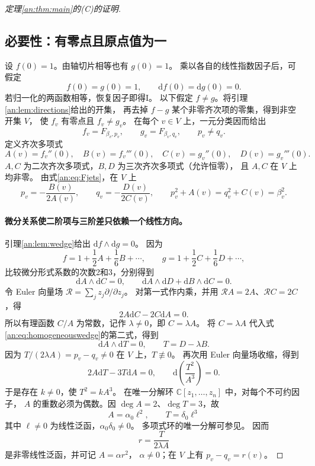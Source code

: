 \documentclass[11pt,a4paper,oneside,openany]{book}
\theoremstyle{lecture}
\newcommand{\C}{\mathbb C}
\newcommand{\dd}{\mathrm d}
\numberwithin{equation}{section}
\begin{document}
\begin{proof}[定理\ref{an:thm:main}的(C)的证明]
\subsection{必要性：有零点且原点值为一}
设 $f(0)=1$。由轴切片相等也有 $g(0)=1$。
乘以各自的线性指数因子后，可假定
\begin{equation}\label{an:eq:normalized}
 f(0)=g(0)=1,\qquad\dd f(0)=\dd g(0)=0.
\end{equation}
若归一化的两函数相等，恢复因子即得I。
以下假定 $f\ne g$。将引理\ref{an:lem:directions}给出的开集，
再去掉 $f-g$ 某个非零齐次项的零集，得到非空开集 $V$，
使 $f_v$ 有零点且 $f_v\ne g_v$。
在每个 $v\in V$ 上，一元分类因而给出
\[
 f_v=F_{\beta_v,p_v},\qquad
 g_v=F_{\beta_v,q_v},\qquad p_v\ne q_v.
\]
定义齐次多项式
\[
 A(v)=f_v''(0),\quad B(v)=f_v'''(0),\quad
 C(v)=g_v''(0),\quad D(v)=g_v'''(0).
\]
$A,C$ 为二次齐次多项式，$B,D$ 为三次齐次多项式（允许恒零），
且 $A,C$ 在 $V$ 上均非零。
由式\eqref{an:eq:Fjets}，在 $V$ 上
\begin{equation}\label{an:eq:pqjets}
 p_v=-\frac{B(v)}{2A(v)},\qquad
 q_v=-\frac{D(v)}{2C(v)},\qquad
 p_v^2+A(v)=q_v^2+C(v)=\beta_v^2.
\end{equation}

\paragraph{微分关系使二阶项与三阶差只依赖一个线性方向。}
引理\ref{an:lem:wedge}给出 $\dd f\wedge\dd g=0$。
因为
\[
 f=1+\frac12 A+\frac16 B+\cdots,\qquad
 g=1+\frac12 C+\frac16 D+\cdots,
\]
比较微分形式系数的次数2和3，分别得到
\begin{equation}\label{an:eq:homogeneouswedge}
 \dd A\wedge\dd C=0,\qquad
 \dd A\wedge\dd D+\dd B\wedge\dd C=0.
\end{equation}
令 Euler 向量场 $\mathcal R=\sum_j z_j\partial/\partial z_j$。
对第一式作内乘，并用 $\mathcal R A=2A$、$\mathcal R C=2C$，得
\[
 2A\dd C-2C\dd A=0.
\]
所以有理函数 $C/A$ 为常数，记作 $\lambda\ne0$，即 $C=\lambda A$。
将 $C=\lambda A$ 代入式\eqref{an:eq:homogeneouswedge}的第二式，得到
\[
 \dd A\wedge\dd T=0,\qquad T=D-\lambda B.
\]
因为 $T/(2\lambda A)=p_v-q_v\ne0$ 在 $V$ 上，$T\not\equiv0$。
再次用 Euler 向量场收缩，得到
\[
 2A\dd T-3T\dd A=0,
 \qquad \dd\!\left(\frac{T^2}{A^3}\right)=0.
\]
于是存在 $k\ne0$，使 $T^2=kA^3$。
在唯一分解环 $\C[z_1,\ldots,z_n]$ 中，对每个不可约因子，
$A$ 的重数必须为偶数。因 $\deg A=2$、$\deg T=3$，故
\[
 A=\alpha_0\ell^2,\qquad T=\delta_0\ell^3
\]
其中 $\ell\ne0$ 为线性泛函，$\alpha_0\delta_0\ne0$。
多项式环的唯一分解可参见\cite[附录D，定理D.6]{lebl}。
因而
\begin{equation}\label{an:eq:rlinear}
 r=\frac{T}{2\lambda A}
\end{equation}
是非零线性泛函，并可记 $A=\alpha r^2$，
$\alpha\ne0$；在 $V$ 上有 $p_v-q_v=r(v)$。


\end{proof}
\end{document}
